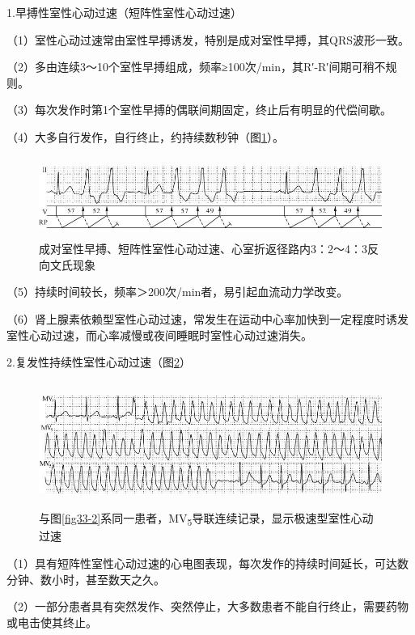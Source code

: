 1.早搏性室性心动过速（短阵性室性心动过速）

（1）室性心动过速常由室性早搏诱发，特别是成对室性早搏，其QRS波形一致。

（2）多由连续3～10个室性早搏组成，频率≥100次/min，其R′-R′间期可稍不规则。

（3）每次发作时第1个室性早搏的偶联间期固定，终止后有明显的代偿间歇。

（4）大多自行发作，自行终止，约持续数秒钟（图\ref{fig33-4}）。

\begin{figure}[!htbp]
 \centering
 \includegraphics[width=5.69792in,height=1.04167in]{./images/Image00533.jpg}
 \captionsetup{justification=centering}
 \caption{成对室性早搏、短阵性室性心动过速、心室折返径路内3：2～4：3反向文氏现象}
 \label{fig33-4}
  \end{figure} 

（5）持续时间较长，频率＞200次/min者，易引起血流动力学改变。

（6）肾上腺素依赖型室性心动过速，常发生在运动中心率加快到一定程度时诱发室性心动过速，而心率减慢或夜间睡眠时室性心动过速消失。

2.复发性持续性室性心动过速（图\ref{fig33-5}）

\begin{figure}[!htbp]
 \centering
 \includegraphics[width=5.67708in,height=1.61458in]{./images/Image00534.jpg}
 \captionsetup{justification=centering}
 \caption{与图\ref{fig33-2}系同一患者，MV\textsubscript{5}导联连续记录，显示极速型室性心动过速}
 \label{fig33-5}
  \end{figure} 


（1）具有短阵性室性心动过速的心电图表现，每次发作的持续时间延长，可达数分钟、数小时，甚至数天之久。

（2）一部分患者具有突然发作、突然停止，大多数患者不能自行终止，需要药物或电击使其终止。

